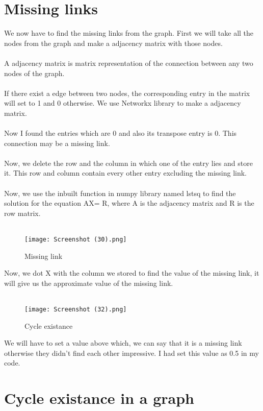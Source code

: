 \documentclass{article}
\begin{document}
\section{Missing links}
We now have to find the missing links from the graph. First we will take all the nodes from the graph and make a adjacency matrix with those nodes.\\\\
A adjacency matrix is matrix representation of the connection between any two nodes of the graph.\\\\
If there exist a edge between two nodes, the corresponding entry in the matrix will set to 1 and 0 otherwise. We use Networkx library to make a adjacency matrix.\\\\
Now I found the entries which are 0 and also its transpose entry is 0. This connection may be a missing link.\\\\
Now, we delete the row and the column in which one of the entry lies and store it. This row and column contain every other entry excluding the missing link. \\\\
Now, we use the inbuilt function in numpy library named lstsq to find the solution for the equation AX= R, where A is the adjacency matrix and R is the row matrix.\\\\
\begin{figure}
    \centering
    \texttt{[image: Screenshot (30).png]}
    \caption{Missing link}
    \label{fig:enter-label}
\end{figure}
Now, we dot X with the column we stored to find the value of the missing link, it will give us the approximate value of the missing link.\\\\
\begin{figure}
    \centering
    \texttt{[image: Screenshot (32).png]}
    \caption{Cycle existance}
    \label{fig:enter-label}
\end{figure}
We will have to set a value above which, we can say that it is a missing link otherwise they didn't find each other impressive. I had set this value as 0.5 in my code.\\
\section{Cycle existance in a graph}
\end{document}
